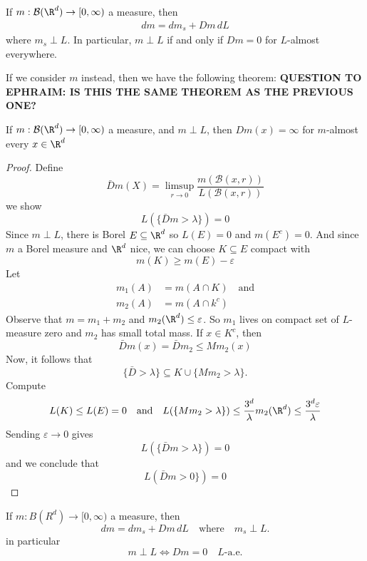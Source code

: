 \begin{corollary}
	If $m : \mathcal{B}(\R^d) \to [0, \infty)$ a measure, then
	\begin{align*}
		dm = dm_{s} + Dm \, dL
	\end{align*} where $m_s \perp L$. In particular, $m \perp L$ if and only if $Dm = 0$ for
	$L$-almost everywhere.
\end{corollary}

If we consider $m$ instead, then we have the following theorem:
\textbf{QUESTION TO EPHRAIM: IS THIS THE SAME THEOREM AS THE PREVIOUS ONE?}

\begin{theorem}
	If $m : \mathcal{B}(\R^d) \to [0, \infty)$ a measure, and $m \perp L$, then $D m(x) = \infty$ for $m$-almost every $x \in \R^d$
\end{theorem}

\begin{proof}
	Define
	\[
		\bar{D} m(X) = \limsup_{r \to 0} \frac{m(\mathcal{B}(x,r))}{L(\mathcal{B}(x,r))}
	\] we show
	\[
		L(\{ \bar{D} m > \lambda \} ) = 0
	\]
	Since $m \perp L$, there is Borel $E \subseteq \R^d$ so $L(E) = 0$ and $m(E^c) = 0$.
	And since  $m$ a Borel measure and $\R^d$ nice, we can choose $K \subseteq E$ compact with
	\[
		m(K) \geq m(E) - \varepsilon
	\]
	Let
	\begin{align*}
		m_1 (A) &= m( A \cap K) \quad \text{and} \\
		m_2 (A) &= m(A \cap k^c)
	\end{align*}
	Observe that $m = m_1 + m_2$ and $m_2 (\R^d) \leq \varepsilon$.
	So $m_1$ lives on compact set of $L$-measure zero and $m_2$ has small total mass.
	If $x \in K^c$, then
	\[
		\bar{D} m(x) = \bar{D}m_2 \leq M m_2 (x)
	\]
	Now, it follows that
	\[
		\{ \bar{D} > \lambda \} \subseteq K \cup \{ M m_2 > \lambda \}.
	\] Compute
	\[
		L(K) \leq L(E) = 0 \quad \text{and} \quad
		L( \{M m_2 > \lambda \}) \leq \frac{3^d}{\lambda} m_2(\R^d) \leq \frac{3^d \varepsilon}{\lambda}
	\] 
	Sending $\varepsilon \to 0$ gives
	\[
		L( \{ \bar{D} m > \lambda \}) = 0
	\] 
	and we conclude that
	\[
	L( \bar{D} m > 0 \}) = 0
	\]
\end{proof}


\begin{corollary}
	If $m : B(R^d) \to [0,\infty)$ a measure, then
	\[
		dm = dm_s + Dm \, dL \quad \text{where} \quad m_s \perp L.
	\] in particular
	\[
		m \perp L \iff D m=0 \quad L\text{-a.e.}
	\]
\end{corollary}

